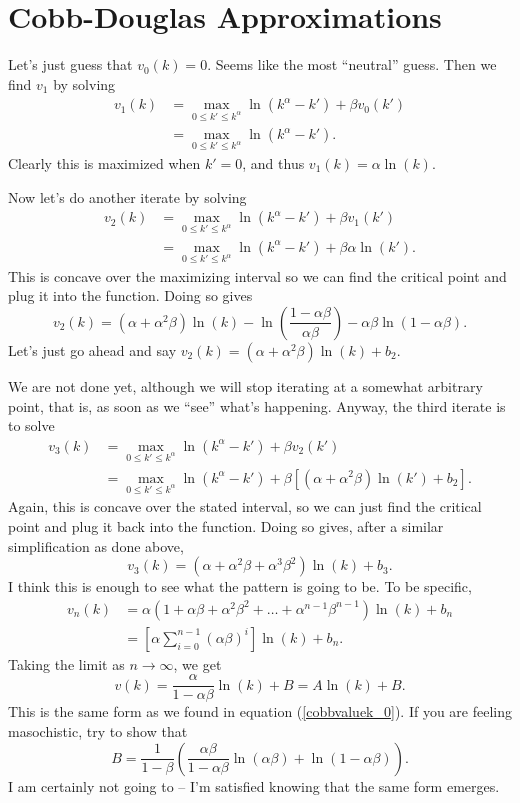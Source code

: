 \documentclass[12pt]{article}
\theoremstyle{definition}
\begin{document}
\section{Cobb-Douglas Approximations}

Let's just guess that $v_0(k)=0$. Seems like the most ``neutral'' guess. Then we find $v_1$ by solving
\begin{align*}
	v_1(k)	&=	\max_{0\leq k' \leq k^{\alpha}} \ln(k^{\alpha} - k') + \beta v_0(k') \\
		&= 	\max_{0\leq k' \leq k^{\alpha}} \ln(k^{\alpha} - k').
\end{align*}
Clearly this is maximized when $k'=0$, and thus $v_1(k)=\alpha \ln(k)$. 

Now let's do another iterate by solving 
\begin{align*}
	v_2(k)	&=	\max_{0\leq k' \leq k^{\alpha}} \ln(k^{\alpha} - k') + \beta v_1(k') \\
		&=	\max_{0\leq k' \leq k^{\alpha}} \ln(k^{\alpha} - k') + \beta \alpha \ln(k').
\end{align*}
This is concave over the maximizing interval so we can find the critical point  and plug it into the function. Doing so gives 
	\[v_2(k)=(\alpha + \alpha^2 \beta)\ln(k) - \ln \left( \frac{1 - \alpha \beta}{\alpha \beta} \right) - \alpha \beta \ln \left(1 - \alpha \beta \right).	\]
Let's just go ahead and say $v_2(k)=(\alpha + \alpha^2 \beta)\ln(k) + b_2$. 

We are not done yet, although we will stop iterating at a somewhat arbitrary point, that is, as soon as we ``see'' what's happening. Anyway, the third iterate is to solve  
\begin{align*}
	v_3(k)	&=	\max_{0\leq k' \leq k^{\alpha}} \ln(k^{\alpha} - k') + \beta v_2(k') \\
		&=	\max_{0\leq k' \leq k^{\alpha}} \ln(k^{\alpha} - k') + \beta \left[(\alpha + \alpha^2 \beta)\ln(k') + b_2 \right].
\end{align*}
Again, this is concave over the stated interval, so we can just find the critical point and plug it back into the function. Doing so gives, after a similar simplification as done above,
	\[v_3(k) = (\alpha + \alpha^2 \beta + \alpha^3  \beta^2)\ln(k) + b_3.	\]
I think this is enough to see what the pattern is going to be. To be specific,
\begin{align*}
	v_n(k)	&=	\alpha\left(1 + \alpha \beta + \alpha^2 \beta^2 + \hdots + \alpha^{n-1} \beta^{n-1}\right) \ln(k)  + b_n\\
			&=\left[\alpha \sum_{i=0}^{n-1} (\alpha \beta)^i \right] \ln(k) + b_n.
\end{align*}
Taking the limit as $n \rightarrow \infty$, we get
	\[v(k)=\frac{\alpha}{1 - \alpha \beta} \ln(k) + B = A\ln(k) +B.	\]
This is the same form as we found in equation (\ref{cobbvaluek_0}). If you are feeling masochistic, try to show that 
	\[B =  \frac{1}{1 - \beta}\left( \frac{\alpha \beta}{1 - \alpha \beta}\ln(\alpha \beta) + \ln(1 - \alpha \beta)	 \right).\]
I am certainly not going to -- I'm satisfied knowing that the same form emerges.\\
\end{document}
